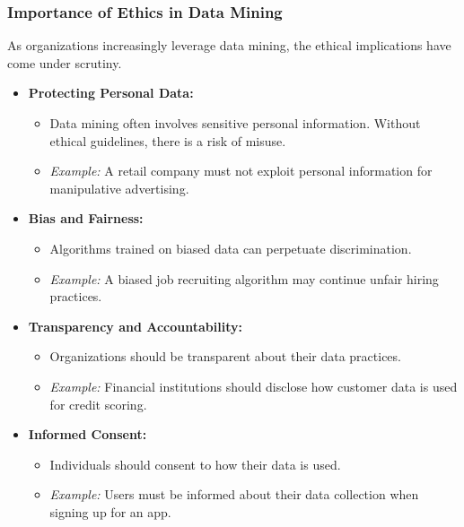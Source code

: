 \documentclass[aspectratio=169]{beamer}
\begin{document}
\begin{frame}[fragile]
    \frametitle{Importance of Ethics in Data Mining}
    
    As organizations increasingly leverage data mining, the ethical implications have come under scrutiny.
    
    \begin{itemize}
        \item \textbf{Protecting Personal Data:}
        \begin{itemize}
            \item Data mining often involves sensitive personal information. Without ethical guidelines, there is a risk of misuse.
            \item \textit{Example:} A retail company must not exploit personal information for manipulative advertising.
        \end{itemize}
        
        \item \textbf{Bias and Fairness:}
        \begin{itemize}
            \item Algorithms trained on biased data can perpetuate discrimination.
            \item \textit{Example:} A biased job recruiting algorithm may continue unfair hiring practices.
        \end{itemize}
        
        \item \textbf{Transparency and Accountability:}
        \begin{itemize}
            \item Organizations should be transparent about their data practices.
            \item \textit{Example:} Financial institutions should disclose how customer data is used for credit scoring.
        \end{itemize}
        
        \item \textbf{Informed Consent:}
        \begin{itemize}
            \item Individuals should consent to how their data is used.
            \item \textit{Example:} Users must be informed about their data collection when signing up for an app.
        \end{itemize}
    \end{itemize}
\end{frame}
\end{document}
